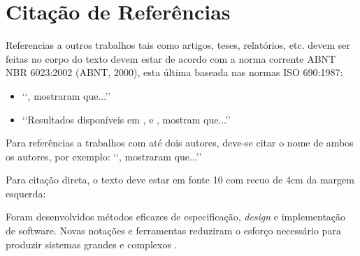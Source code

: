 \section{Citação de Referências}

Referencias a outros trabalhos tais como artigos, teses, relatórios, etc. devem 
ser feitas no corpo do texto devem estar de acordo com a norma corrente ABNT 
NBR 6023:2002 (ABNT, 2000), esta última baseada nas normas ISO 690:1987:
\begin{itemize}
	\item \lq\lq {}, mostraram que...\rq\rq

	\item \lq\lq Resultados disponíveis em \cite{coimbra1978}, \cite{clark1986} 
	e \cite{sparrow1980}, mostram que...\rq\rq
\end{itemize}

Para referências a trabalhos com até dois autores, deve-se citar o nome de 
ambos os autores, por exemplo: \lq\lq {}, mostraram 
que...\rq\rq

Para citação direta, o texto deve estar em fonte 10 com recuo de 4cm da margem esquerda:

\begin{citacao}
Foram desenvolvidos métodos eficazes de especificação, \textit{design} e implementação de software.  Novas notações e ferramentas reduziram o esforço necessário para produzir sistemas grandes e complexos \cite{Sommerville2007}.
\end{citacao}

